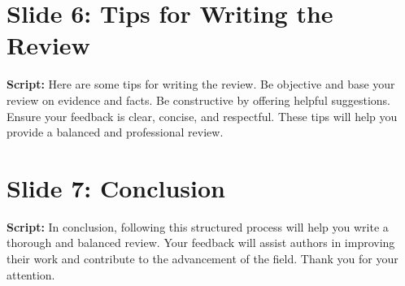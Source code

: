 \documentclass[12pt]{article}
\begin{document}
\section{Slide 6: Tips for Writing the Review}
\textbf{Script:}
Here are some tips for writing the review. Be objective and base your review on evidence and facts. Be constructive by offering helpful suggestions. Ensure your feedback is clear, concise, and respectful. These tips will help you provide a balanced and professional review.

\section{Slide 7: Conclusion}
\textbf{Script:}
In conclusion, following this structured process will help you write a thorough and balanced review. Your feedback will assist authors in improving their work and contribute to the advancement of the field. Thank you for your attention.
\end{document}
